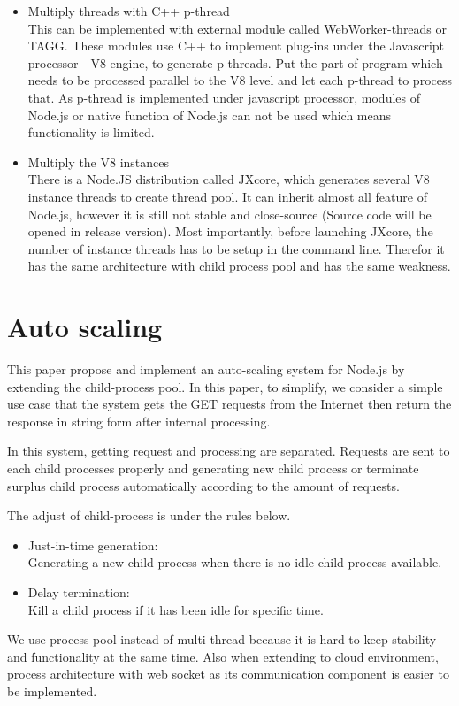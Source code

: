 \documentclass[JIP]{ipsj}
\begin{document}
\begin{itemize}
\item Multiply threads with C++ p-thread\\
This can be implemented with external module called WebWorker-threads or TAGG.
These modules use C++ to implement plug-ins under the Javascript processor - V8 engine, to generate p-threads. 
Put the part of program which needs to be processed parallel to the V8 level and let each p-thread to process that.
As p-thread is implemented under javascript processor, modules of Node.js or native function of Node.js can not be used which means functionality is limited. 


\item Multiply the V8 instances\\
There is a Node.JS distribution called JXcore, which generates several V8 instance threads to create thread pool.
It can inherit almost all feature of Node.js, however it is still not stable and close-source (Source code will be opened in release version).
Most importantly, before launching JXcore, the number of instance threads has to be setup in the command line.
Therefor it has the same architecture with child process pool and has the same weakness.

\end{itemize}

\section{Auto scaling}
This paper propose and implement an auto-scaling system for Node.js by extending the child-process pool. 
In this paper, to simplify, we consider a simple use case that the system gets the GET requests from the Internet then return the response in string form after internal processing.

In this system, getting request and processing are separated. Requests are sent to each child processes properly and generating new child process or terminate surplus child process automatically according to the amount of requests.

The adjust of child-process is under the rules below.

\begin{itemize}
\item Just-in-time generation:\\
Generating a new child process when there is no idle child process available.
\item Delay termination:\\
Kill a child process if it has been idle for specific time.
\end{itemize}
We use process pool instead of multi-thread because it is hard to keep stability and functionality at the same time.
Also when extending to cloud environment, process architecture with web socket as its communication component is easier to be implemented.
\end{document}
